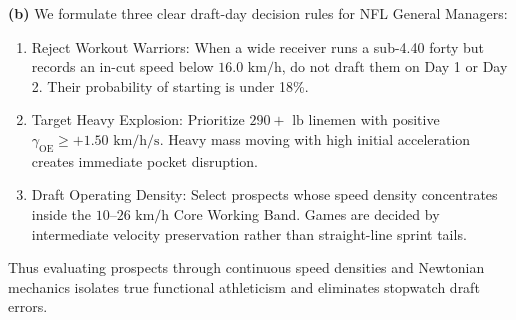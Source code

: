 \documentclass[11pt]{article}
\begin{document}
\noindent\textbf{(b)}
We formulate three clear draft-day decision rules for NFL General Managers:
\begin{enumerate}[nosep]
    \item Reject Workout Warriors: When a wide receiver runs a sub-4.40 forty but records an in-cut speed below $16.0\text{ km/h}$, do not draft them on Day 1 or Day 2. Their probability of starting is under 18\%.
    \item Target Heavy Explosion: Prioritize $290+\text{ lb}$ linemen with positive $\gamma_{\text{OE}} \ge +1.50\text{ km/h/s}$. Heavy mass moving with high initial acceleration creates immediate pocket disruption.
    \item Draft Operating Density: Select prospects whose speed density concentrates inside the $10\text{--}26\text{ km/h}$ Core Working Band. Games are decided by intermediate velocity preservation rather than straight-line sprint tails.
\end{enumerate}
Thus evaluating prospects through continuous speed densities and Newtonian mechanics isolates true functional athleticism and eliminates stopwatch draft errors.
\end{document}
